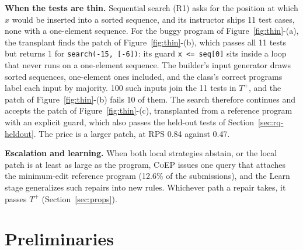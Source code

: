 \documentclass[acmsmall,screen,review,anonymous,nonacm]{acmart}
\newcommand{\tool}{\textsc{CoEP}\xspace}
\begin{document}
\textbf{When the tests are thin.} Sequential search (R1) asks for the position at which $x$ would be inserted into a sorted sequence, and its instructor ships 11 test cases, none with a one-element sequence. For the buggy program of Figure~\ref{fig:thin}-(a), the transplant finds the patch of Figure~\ref{fig:thin}-(b), which passes all 11 tests but returns 1 for \texttt{search(-15, [-6])}: its guard \texttt{x <= seq[0]} sits inside a loop that never runs on a one-element sequence. The builder's input generator draws sorted sequences, one-element ones included, and the class's correct programs label each input by majority. 100 such inputs join the 11 tests in $T^{+}$, and the patch of Figure~\ref{fig:thin}-(b) fails 10 of them. The search therefore continues and accepts the patch of Figure~\ref{fig:thin}-(c), transplanted from a reference program with an explicit guard, which also passes the held-out tests of Section~\ref{sec:rq-heldout}. The price is a larger patch, at RPS 0.84 against 0.47.

\textbf{Escalation and learning.} When both local strategies abstain, or the local patch is at least as large as the program, \tool issues one query that attaches the minimum-edit reference program (12.6\% of the submissions), and the Learn stage generalizes such repairs into new rules. Whichever path a repair takes, it passes $T^{+}$ (Section~\ref{sec:props}).

\section{Preliminaries}
\label{sec:prelim}
\end{document}
